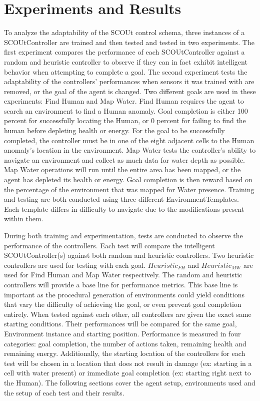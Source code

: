 

\chapter{Experiments and Results}
To analyze the adaptability of the SCOUt control schema, three instances of a SCOUtController are trained and then tested and tested in two experiments.
The first experiment compares the performance of each SCOUtController against a random and heuristic controller to observe if they can in fact exhibit intelligent behavior when attempting to complete a goal.
The second experiment tests the adaptability of the controllers' performances when sensors it was trained with are removed, or the goal of the agent is changed.
Two different goals are used in these experiments: Find Human and Map Water.
Find Human requires the agent to search an environment to find a Human anomaly.
Goal completion is either 100 percent for successfully locating the Human, or 0 percent for failing to find the human before depleting health or energy.
For the goal to be successfully completed, the controller must be in one of the eight adjacent cells to the Human anomaly's location in the environment. 
Map Water tests the controller's ability to navigate an environment and collect as much data for water depth as possible.
Map Water operations will run until the entire area has been mapped, or the agent has depleted its health or energy.
Goal completion is then reward based on the percentage of the environment that was mapped for Water presence.
Training and testing are both conducted using three different EnvironmentTemplates.
Each template differs in difficulty to navigate due to the modifications present within them.

During both training and experimentation, tests are conducted to observe the performance of the controllers.
Each test will compare the intelligent SCOUtController(s) against both random and heuristic controllers.
Two heuristic controllers are used for testing with each goal.
$Heuristic_{FH}$ and $Heuristic_{MW}$ are used for Find Human and Map Water respectively.
The random and heuristic controllers will provide a base line for performance metrics.
This base line is important as the procedural generation of environments could yield conditions that vary the difficulty of achieving the goal, or even prevent goal completion entirely.
When tested against each other, all controllers are given the exact same starting conditions.
Their performances will be compared for the same goal, Environment instance and starting position.
Performance is measured in four categories: goal completion, the number of actions taken, remaining health and remaining energy.
Additionally, the starting location of the controllers for each test will be chosen in a location that does not result in damage (ex: starting in a cell with water present) or immediate goal completion (ex: starting right next to the Human).
The following sections cover the agent setup, environments used and the setup of each test and their results.


